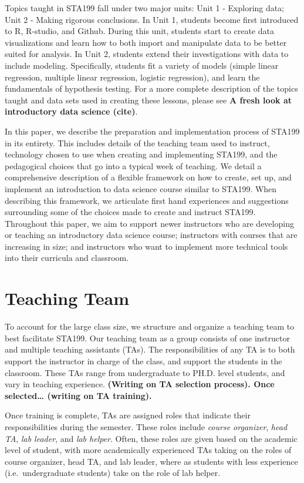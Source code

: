 \documentclass[
  12pt]{article}
\begin{document}
Topics taught in STA199 fall under two major units: Unit 1 - Exploring
data; Unit 2 - Making rigorous conclusions. In Unit 1, students become
first introduced to R, R-studio, and Github. During this unit, students
start to create data visualizations and learn how to both import and
manipulate data to be better suited for analysis. In Unit 2, students
extend their investigations with data to include modeling. Specifically,
students fit a variety of models (simple linear regression, multiple
linear regression, logistic regression), and learn the fundamentals of
hypothesis testing. For a more complete description of the topics taught
and data sets used in creating these lessons, please see \textbf{A fresh
look at introductory data science (cite)}.

In this paper, we describe the preparation and implementation process of
STA199 in its entirety. This includes details of the teaching team used
to instruct, technology chosen to use when creating and implementing
STA199, and the pedagogical choices that go into a typical week of
teaching. We detail a comprehensive description of a flexible framework
on how to create, set up, and implement an introduction to data science
course similar to STA199. When describing this framework, we articulate
first hand experiences and suggestions surrounding some of the choices
made to create and instruct STA199. Throughout this paper, we aim to
support newer instructors who are developing or teaching an introductory
data science course; instructors with courses that are increasing in
size; and instructors who want to implement more technical tools into
their curricula and classroom.

\hypertarget{teaching-team}{%
\section{Teaching Team}\label{teaching-team}}

To account for the large class size, we structure and organize a
teaching team to best facilitate STA199. Our teaching team as a group
consists of one instructor and multiple teaching assistants (TAs). The
responsibilities of any TA is to both support the instructor in charge
of the class, and support the students in the classroom. These TAs range
from undergraduate to PH.D. level students, and vary in teaching
experience. \textbf{(Writing on TA selection process). Once
selected\ldots{} (writing on TA training).}

Once training is complete, TAs are assigned roles that indicate their
responsibilities during the semester. These roles include \emph{course
organizer}, \emph{head TA}, \emph{lab leader}, and \emph{lab helper}.
Often, these roles are given based on the academic level of student,
with more academically experienced TAs taking on the roles of course
organizer, head TA, and lab leader, where as students with less
experience (i.e.~undergraduate students) take on the role of lab helper.
\end{document}
